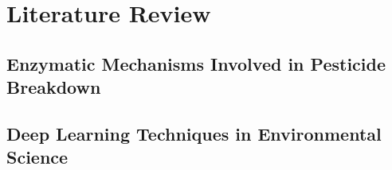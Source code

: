 \section*{Literature Review}

\subsection{Enzymatic Mechanisms Involved in Pesticide Breakdown}
\label{sec:Enzymatic Mechanisms Involved in Pesticide Breakdown}

\subsection{Deep Learning Techniques in Environmental Science}
\label{sec:Deep Learning Techniques in Environmental Science}
